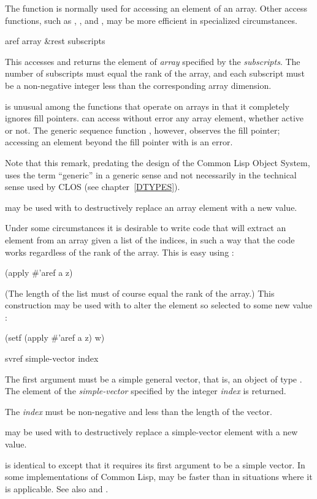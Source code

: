 The function  is normally
used for accessing an element of an array.
Other access functions, such as , , and ,
may be more efficient in specialized circumstances.

\begin{defun}[Function]
aref array &rest subscripts

This accesses and returns the element of \emph{array} specified
by the \emph{subscripts}.  The number of subscripts must
equal the rank of the array, and each subscript must be
a non-negative integer less than the corresponding array dimension.

 is unusual among the functions that operate on arrays
in that it completely ignores fill pointers.   can access
without error any array element, whether active or not.  The generic
sequence function , however, observes the fill pointer;
accessing an element beyond the fill pointer with  is an error.

Note that this remark, predating the design of the Common Lisp Object System,
uses the term ``generic'' in a generic sense and not necessarily
in the technical sense used by CLOS
(see chapter~\ref{DTYPES}).

 may be used with  to destructively replace
an array element with a new value.

Under some circumstances it is desirable to write code that
will extract an element from an array  given a list  of the indices,
in such a way that the code works regardless of the rank of the
array.  This is easy using :
\begin{lisp}
(apply \#'aref a z)
\end{lisp}
(The length of the list must of course equal the rank of
the array.)  This construction may be used with  to alter
the element so selected to some new value :
\begin{lisp}
(setf (apply \#'aref a z) w)
\end{lisp}
\end{defun}

\begin{defun}[Function]
svref simple-vector index

The first argument must be a simple general vector,
that is, an object of type .
The element of the \emph{simple-vector} specified by the integer \emph{index}
is returned.

The \emph{index} must be non-negative and less than
the length of the vector.

 may be used with  to destructively replace
a simple-vector element with a new value.

 is identical to  except that it requires its first
argument to be a simple vector.  In some implementations of Common Lisp,
 may be faster than  in situations where it is applicable.
See also  and .
\end{defun}

